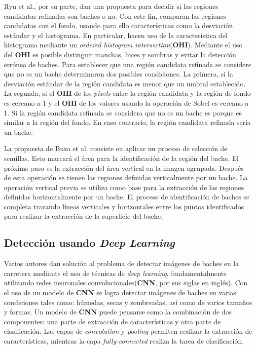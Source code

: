 		Ryu et al., por su parte, dan una propuesta para decidir si las regiones candidatas refinadas son baches o no. Con este fin, 
		comparan las regiones candidatas con el fondo, usando para ello características como la desviación estándar y el histograma. En particular, hacen 
		uso de la característica del histograma mediante un \emph{ordered histogram intersection}(\textbf{OHI}). Mediante el uso del \textbf{OHI} es posible 
		distinguir manchas, luces y sombras y evitar la detección errónea de baches. Para establecer que una región candidata refinada se considere que no es un 
		bache determinaron dos posibles condiciones. La primera, si la desviación estándar de la región candidata es menor que un umbral establecido. La segunda, 
		si el \textbf{OHI} de los \emph{pixels} entre la región candidata y la región de fondo   es cercano a 1 y el \textbf{OHI} de los valores usando la operación 
		de Sobel es cercano a 1. Si la región candidata refinada se considera que no es un bache es porque es similar a la región del fondo. En caso contrario, 
		la región candidata refinada sería un bache.
		
		La propuesta de Buza et al. consiste en aplicar un proceso de selección de semillas. Esto marcará el área para la identificación 
		de la región del bache. El próximo paso es la extracción del área vertical en la imagen agrupada. Después de esta operación se tienen las regiones 
		definidas verticalmente por un bache. La operación vertical previa se utiliza como base para la extracción de las regiones definidas horizontalmente 
		por un bache. El proceso de identificación de baches se completa trazando líneas verticales y horizontales entre los puntos identificados para 
		realizar la extracción de la superficie del bache.

	\subsection{Detección usando \emph{Deep Learning}}
	Varios autores dan solución al problema de detectar imágenes de baches en la carretera mediante el uso de técnicas 
	de \emph{deep learning}, fundamentalmente utilizando redes neuronales convolucionales(\textbf{CNN}, por sus siglas en inglés). Con el uso 
	de un modelo de \textbf{CNN} se logra  detectar imágenes de baches en varias condiciones tales como: húmedas, secas y sombreadas, así como de varios 
	tamaños y formas. Un modelo de \textbf{CNN} puede pensarse como la combinación de dos componentes: una parte de extracción de características
	y otra parte de clasificación. Las capas de \emph{convolution} y \emph{pooling}  permiten realizar la extracción de características,
	mientras la capa \emph{fully-connected} realiza la tarea de clasificación. 

